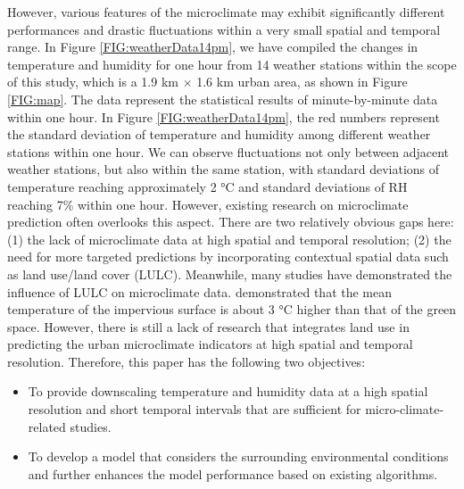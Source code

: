 \documentclass[a4paper,fleqn]{cas-sc}
\begin{document}


However, various features of the microclimate may exhibit significantly different performances and drastic fluctuations within a very small spatial and temporal range. In Figure \ref{FIG:weatherData14pm}, we have compiled the changes in temperature and humidity for one hour from 14 weather stations within the scope of this study, which is a  1.9 km $\times$ 1.6 km urban area, as shown in Figure \ref{FIG:map}. The data represent the statistical results of minute-by-minute data within one hour. In Figure \ref{FIG:weatherData14pm}, the red numbers represent the standard deviation of temperature and humidity among different weather stations within one hour. We can observe fluctuations not only between adjacent weather stations, but also within the same station, with standard deviations of temperature reaching approximately 2 °C and standard deviations of RH reaching 7\% within one hour. However, existing research on microclimate prediction often overlooks this aspect. There are two relatively obvious gaps here: (1) the lack of microclimate data at high spatial and temporal resolution; (2) the need for more targeted predictions by incorporating contextual spatial data such as land use/land cover (LULC). Meanwhile, many studies have demonstrated the influence of LULC on microclimate data. \citet{estoque2017effects} demonstrated that the mean temperature of the impervious surface is about 3 °C higher than that of the green space. However, there is still a lack of research that integrates land use in predicting the urban microclimate indicators at high spatial and temporal resolution. Therefore, this paper has the following two objectives:
\begin{itemize}
\item{To provide downscaling temperature and humidity data at a high spatial resolution and short temporal intervals that are sufficient for micro-climate-related studies.}
\item{To develop a model that considers the surrounding environmental conditions and further enhances the model performance based on existing algorithms.}
\end{itemize}
\end{document}
